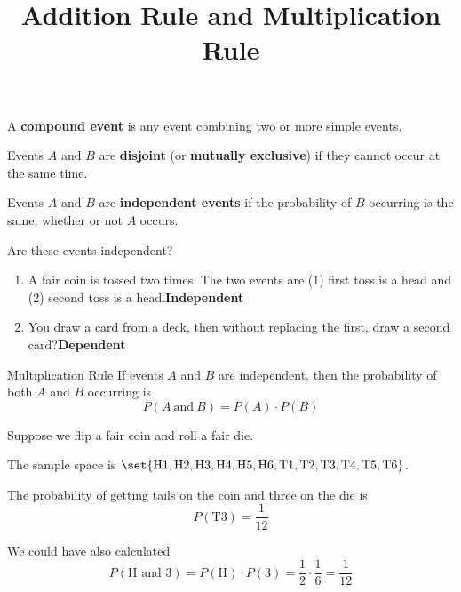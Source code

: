 \documentclass{beamer}
\title[MA205 - Section 4.2]{Addition Rule and Multiplication Rule}
\newcommand{\prob}[1]{P\left(#1\right)}
\begin{document}
\begin{frame}
\titlepage
\end{frame}

\begin{frame}
\begin{definition}
A \textbf{compound event} is any event combining two or more simple events.
\end{definition}\pause

\begin{definition}
Events $A$ and $B$ are \textbf{disjoint} (or \textbf{mutually exclusive}) if they cannot occur at the same time.
\end{definition}\pause

\begin{definition}
Events $A$ and $B$ are \textbf{independent events} if the probability of $B$ occurring is the same, whether or not $A$ occurs.
\end{definition}\pause

\begin{example}
Are these events independent?
\begin{enumerate}
\item A fair coin is tossed two times. The two events are (1) first toss is a head and (2) second toss is a head.\pause \quad\textbf{Independent}\pause
\item You draw a card from a deck, then without replacing the first, draw a second card?\pause \quad\textbf{Dependent}
\end{enumerate}
\end{example}
\end{frame}

\begin{frame}
\begin{block}{Multiplication Rule}
If events $A$ and $B$ are independent, then the probability of both $A$ and $B$ occurring is
\begin{equation*}
\prob{A~\text{and}~B}=\prob{A} \cdot \prob{B}
\end{equation*}
\end{block}\pause

\begin{example}
Suppose we flip a fair coin and roll a fair die. 

\vspace{2mm}
The sample space is $\set{\text{H1}, \text{H2}, \text{H3}, \text{H4}, \text{H5}, \text{H6}, \text{T1}, \text{T2}, \text{T3}, \text{T4}, \text{T5}, \text{T6}}$.\pause

\vspace{2mm}
The probability of getting tails on the coin and three on the die is 
\begin{equation*}
\prob{\text{T3}}=\dfrac{1}{12}
\end{equation*}\pause

We could have also calculated
\begin{equation*}
\prob{\text{H and 3}} = \prob{\text{H}}\cdot\prob{3} = \dfrac{1}{2}\cdot\dfrac{1}{6} = \dfrac{1}{12}
\end{equation*}
\end{example}
\end{frame}
\end{document}
